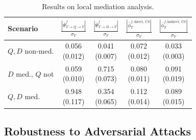 \documentclass{article}
\theoremstyle{plain}
\theoremstyle{definition}
\theoremstyle{remark}
\newcommand{\effect}{\Psi}
\theoremstyle{mystyle}
\begin{document}
\begin{table}
\centering
  \caption{Results on local mediation analysis. %
  }%
\label{tab:synthetic_xp_localmediation_twovars}
\setlength{\tabcolsep}{2pt}
\begin{tabular}{l|cccc}
Scenario &  $\frac{|\bar{\effect}^f_{T \rightarrow Q \rightarrow Y}|}{\sigma_Y}$ & $\frac{|\bar{\effect}^f_{T \rightarrow D \rightarrow Y}|}{\sigma_Y}$ & $\frac{|\bar{\phi}^{f,\text{direct, CS}}_T|}{\sigma_Y}$ & $\frac{|\bar{\phi}^{f,\text{indirect, CS}}_T|}{\sigma_Y}$ \\ 
\toprule
\makecell[l]{$Q, D$ \\ non-med.} & \makecell{0.056 \\ (0.012)} & \makecell{0.041 \\ (0.007)} & \makecell{0.072 \\ (0.012)} & \makecell{0.033 \\ (0.003)} \\ 
\midrule
\makecell[l]{$D$ med.,\\$Q$ not} & \makecell{0.059 \\ (0.010)} & \makecell{0.715 \\ (0.073)} & \makecell{0.080 \\ (0.011)}  & \makecell{0.091 \\ (0.019)} \\ 
\midrule
\makecell[l]{$Q, D$ \\ med.} & \makecell{0.948 \\ (0.117)} & \makecell{0.354 \\ (0.065)} & \makecell{0.112 \\ (0.014)} & \makecell{0.089 \\ (0.015)}   \\
\end{tabular}
\vspace*{-0.5cm}
\end{table}


\subsection{Robustness to Adversarial Attacks}
\end{document}
